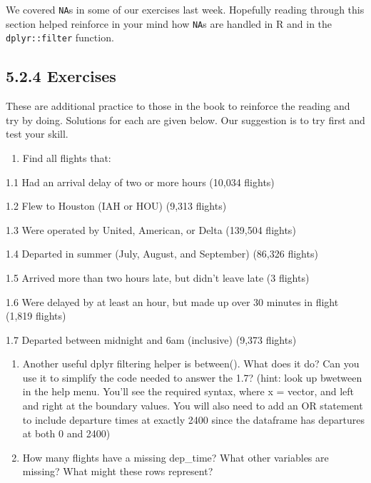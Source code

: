 \documentclass[
]{article}
\providecommand{\tightlist}{%
  \setlength{\itemsep}{0pt}\setlength{\parskip}{0pt}}
\begin{document}
We covered \texttt{NA}s in some of our exercises last week. Hopefully
reading through this section helped reinforce in your mind how
\texttt{NA}s are handled in R and in the \texttt{dplyr::filter}
function.

\hypertarget{exercises}{%
\subsection{5.2.4 Exercises}\label{exercises}}

These are additional practice to those in the book to reinforce the
reading and try by doing. Solutions for each are given below. Our
suggestion is to try first and test your skill.

\begin{enumerate}
\def\labelenumi{\arabic{enumi}.}
\tightlist
\item
  Find all flights that:
\end{enumerate}

1.1 Had an arrival delay of two or more hours (10,034 flights)

1.2 Flew to Houston (IAH or HOU) (9,313 flights)

1.3 Were operated by United, American, or Delta (139,504 flights)

1.4 Departed in summer (July, August, and September) (86,326 flights)

1.5 Arrived more than two hours late, but didn't leave late (3 flights)

1.6 Were delayed by at least an hour, but made up over 30 minutes in
flight (1,819 flights)

1.7 Departed between midnight and 6am (inclusive) (9,373 flights)

\begin{enumerate}
\def\labelenumi{\arabic{enumi}.}
\setcounter{enumi}{1}
\item
  Another useful dplyr filtering helper is between(). What does it do?
  Can you use it to simplify the code needed to answer the 1.7? (hint:
  look up bwetween in the help menu. You'll see the required syntax,
  where x = vector, and left and right at the boundary values. You will
  also need to add an OR statement to include departure times at exactly
  2400 since the dataframe has departures at both 0 and 2400)
\item
  How many flights have a missing dep\_time? What other variables are
  missing? What might these rows represent?
\end{enumerate}
\end{document}
